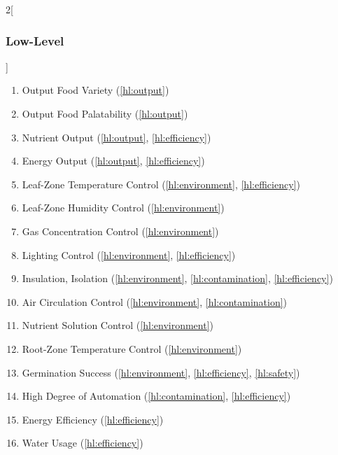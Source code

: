 \documentclass{../tex/report}
\begin{document}
\begin{multicols}{2}[\subsubsection{Low-Level}\label{sec:llos}]
    \begin{enumerate}[label=LL\arabic*., ref=LL\arabic*]
        \item \label{ll:output_variety} Output Food Variety \hfill (\ref{hl:output})
        \item \label{ll:output_palatability} Output Food Palatability \hfill (\ref{hl:output})
        \item \label{ll:output_nutrients} Nutrient Output \hfill (\ref{hl:output}, \ref{hl:efficiency})
        \item \label{ll:output_energy} Energy Output \hfill (\ref{hl:output}, \ref{hl:efficiency})
        \item \label{ll:control_airtemp} Leaf-Zone Temperature Control \hfill (\ref{hl:environment}, \ref{hl:efficiency})
        \item \label{ll:control_airhum} Leaf-Zone Humidity Control \hfill (\ref{hl:environment})
        \item \label{ll:control_gas} Gas Concentration Control \hfill (\ref{hl:environment})
        \item \label{ll:control_light} Lighting Control \hfill (\ref{hl:environment}, \ref{hl:efficiency})
        \item \label{ll:insulateisolate} Insulation, Isolation \hfill (\ref{hl:environment}, \ref{hl:contamination}, \ref{hl:efficiency})
        \item \label{ll:control_aircirculation} Air Circulation Control \hfill (\ref{hl:environment}, \ref{hl:contamination})
        \item \label{ll:control_nutrientsolution} Nutrient Solution Control \hfill (\ref{hl:environment})
        \item \label{ll:control_roottemp} Root-Zone Temperature Control \hfill (\ref{hl:environment})
        \item \label{ll:germinationsuccess} Germination Success \hfill (\ref{hl:environment}, \ref{hl:efficiency}, \ref{hl:safety})
        \item \label{ll:automation} High Degree of Automation \hfill (\ref{hl:contamination}, \ref{hl:efficiency})
        \item \label{ll:efficiency_energy} Energy Efficiency \hfill (\ref{hl:efficiency})
        \item \label{ll:efficiency_water} Water Usage \hfill (\ref{hl:efficiency})

\end{enumerate}
\end{multicols}
\end{document}

